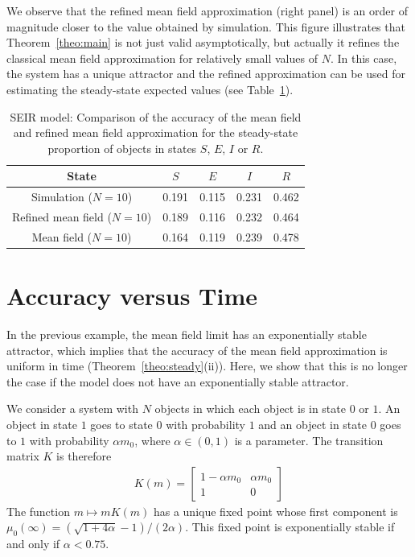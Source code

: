 \documentclass{sig-alternate-per}
\begin{document}
We observe that the refined mean field approximation (right panel) is
an order of magnitude closer to the value obtained by simulation. This
figure illustrates that Theorem~\ref{theo:main} is not just valid
asymptotically, but actually it refines the classical mean field
approximation for relatively small values of $N$. In this case, the
system has a unique attractor and the refined approximation can be
used for estimating the steady-state expected values (see
Table~\ref{tbl:steadySEIR}).

 \begin{table}[ht]
\begin{center}
\begin{tabular}{@{}|@{~}c@{~}|c|c|c|c|}\hline
State                                & $S$ & $E$ & $I$ & $R$ \\\hline
Simulation ($N=10$)            & 0.191 & 0.115 & 0.231 &0.462 \\ \hline
Refined mean field ($N=10$) & 0.189& 0.116 & 0.232& 0.464\\ \hline
Mean field ($N=10$)               & 0.164 & 0.119 & 0.239 & 0.478\\ \hline
\end{tabular}
\end{center}
\caption{\label{tbl:steadySEIR} SEIR model: Comparison of the accuracy
  of the mean field and refined mean field approximation for the
  steady-state proportion of objects in states $S$, $E$, $I$ or $R$. }
\end{table}
   

\section{Accuracy versus Time}

In the previous example, the mean field limit has an exponentially
stable attractor, which implies that the accuracy of the mean field
approximation is uniform in time (Theorem~\ref{theo:steady}(ii)).
Here, we show that this is no longer the case if the model does not
have an exponentially stable attractor.

We consider a system with $N$ objects in which each object is in state
$0$ or $1$. An object in state $1$ goes to state $0$ with probability
$1$ and an object in state $0$ goes to $1$ with probability
$\alpha m_0$, where $\alpha\in(0,1)$ is a parameter. The transition
matrix $K$ is therefore
\begin{align*}
  K(m) = \left[
  \begin{array}{cc}
    1-\alpha m_0&\alpha m_0\\
    1 & 0
  \end{array}
\right]
\end{align*}
The function $m\mapsto mK(m)$ has a unique fixed point whose first
component is $\mu_0(\infty)=(\sqrt{1+4\alpha}-1)/(2\alpha)$. This
fixed point is exponentially stable if and only if $\alpha < 0.75$.
\end{document}

